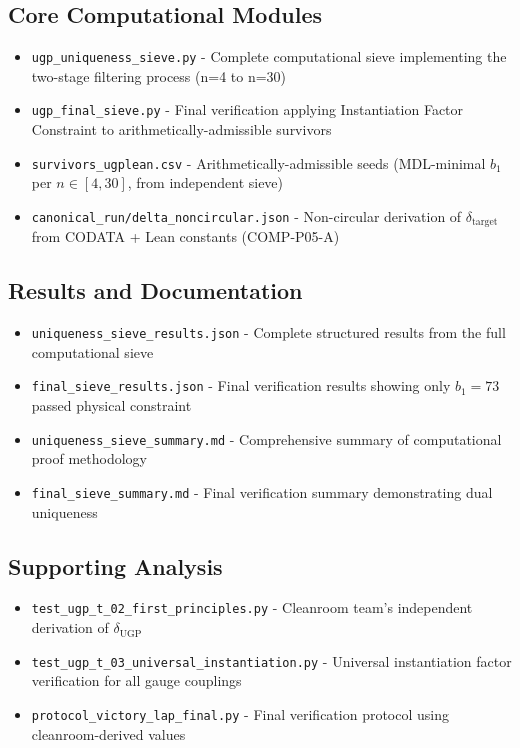 \documentclass[11pt,twocolumn]{article}
\theoremstyle{remark}
\begin{document}
\subsection*{Core Computational Modules}
\begin{itemize}[leftmargin=1.2em,itemsep=0.2em]
    \item \texttt{ugp\_uniqueness\_sieve.py} - Complete computational sieve implementing the two-stage filtering process (n=4 to n=30)
    \item \texttt{ugp\_final\_sieve.py} - Final verification applying Instantiation Factor Constraint to arithmetically-admissible survivors
    \item \texttt{survivors\_ugplean.csv} - Arithmetically-admissible seeds (MDL-minimal $b_1$ per $n\in[4,30]$, from independent sieve)
    \item \texttt{canonical\_run/delta\_noncircular.json} - Non-circular derivation of $\delta_{\text{target}}$ from CODATA + Lean constants (COMP-P05-A)
\end{itemize}

\subsection*{Results and Documentation}
\begin{itemize}[leftmargin=1.2em,itemsep=0.2em]
    \item \texttt{uniqueness\_sieve\_results.json} - Complete structured results from the full computational sieve
    \item \texttt{final\_sieve\_results.json} - Final verification results showing only $b_1=73$ passed physical constraint
    \item \texttt{uniqueness\_sieve\_summary.md} - Comprehensive summary of computational proof methodology
    \item \texttt{final\_sieve\_summary.md} - Final verification summary demonstrating dual uniqueness
\end{itemize}

\subsection*{Supporting Analysis}
\begin{itemize}[leftmargin=1.2em,itemsep=0.2em]
    \item \texttt{test\_ugp\_t\_02\_first\_principles.py} - Cleanroom team's independent derivation of $\delta_{\text{UGP}}$
    \item \texttt{test\_ugp\_t\_03\_universal\_instantiation.py} - Universal instantiation factor verification for all gauge couplings
    \item \texttt{protocol\_victory\_lap\_final.py} - Final verification protocol using cleanroom-derived values
\end{itemize}
\end{document}
